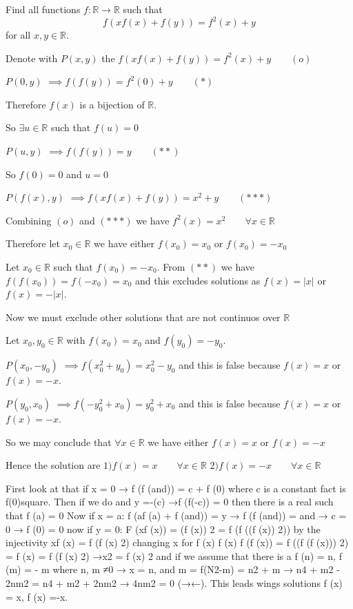 \begin{solution}
	\begin{tcolorbox}Find all functions $ f: \mathbb R \to \mathbb R$ such that
\[ f( xf(x) + f(y) ) = f^2(x) + y\]
for all $ x,y\in \mathbb R$.\end{tcolorbox}

Denote with $ P(x,y)$ the $ f( xf(x) + f(y) ) = f^2(x) + y \qquad (o)$

$ P(0,y)$ $ \implies f(f(y))=f^2(0)+y\qquad(*)$

Therefore $ f(x)$ is a bijection of $ \mathbb {R}$.

So $ \exists u\in\mathbb{R}$ such that $ f(u)=0$

$ P(u,y)$ $ \implies f(f(y))=y\qquad(**)$

So $ f(0)=0$ and $ u=0$

$ P(f(x),y)$ $ \implies f(xf(x) + f(y))=x^2+y\qquad (***)$

Combining $ (o)$ and $ (***)$ we have $ f^2(x)=x^2 \qquad \forall x\in\mathbb R$

Therefore let $ x_0 \in \mathbb{R}$ we have either $ f(x_0)=x_0$ or $ f(x_0)=-x_0$

Let $ x_0 \in \mathbb{R}$ such that $ f(x_0)=-x_0$. From $ (**)$ we have $ f(f(x_0))=f(-x_0)=x_0$
and this excludes solutions as $ f(x)=|x|$ or $ f(x)=-|x|$.

Now we must exclude other solutions that are not continuos over $ \mathbb{R}$ 

Let $ x_0,y_0 \in \mathbb{R}$ with $ f(x_0)=x_0$ and $ f(y_0)=-y_0$.

$ P(x_0,-y_0)$ $ \implies f(x_0^2+y_0)=x_0^2-y_0$ and this is false because $ f(x)=x$ or $ f(x)=-x$. 

$ P(y_0,x_0)$ $ \implies f(-y_0^2+x_0)=y_0^2+x_0$ and this is false because $ f(x)=x$ or $ f(x)=-x$. 

So we may conclude that $ \forall x\in \mathbb{R}$ we have either $ f(x)=x$ or $ f(x)=-x$

Hence the solution are 
${ 1) f(x)=x\qquad \forall x\in\mathbb{R}}$
${ 2) f(x)=-x\qquad \forall x\in\mathbb{R}}$
\end{solution}



\begin{solution}
	First look at that if x = 0 → f (f (and)) = c + f (0) where c is a constant fact is f(0)square.
Then if we do and y =-(c) →f (f(-c)) = 0 then there is a real such that f (a) = 0
Now if x = a: f (af (a) + f (and)) = y → f (f (and)) = and → c = 0 → f (0) = 0 now if y = 0:
F (xf (x)) = (f (x)) 2 = f (f ((f (x)) 2)) by the injectivity xf (x) = f (f (x) 2) changing x for f (x)
f (x) f (f (x)) = f ((f (f (x))) 2) = f (x) = f (f (x) 2) →x2 = f (x) 2 and if we assume that there is a f (n) = n, f (m) = - m
where n, m ≠0 → x = n, and m =
f(N2-m) = n2 + m → n4 + m2 - 2nm2 = n4 + m2 + 2nm2 → 4nm2 = 0 (→←).
This leads wings solutions f (x) = x, f (x) =-x.
\end{solution}



